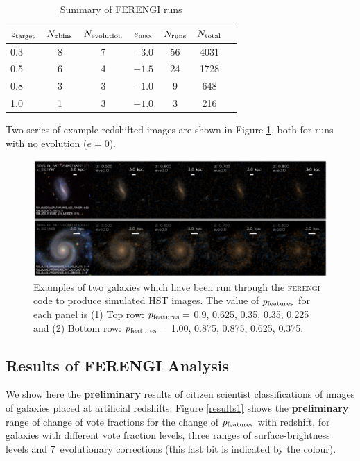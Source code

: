 \documentclass[usenatbib]{mn2e}
\newcommand{\ferengi}{\textsc{ferengi}}
\begin{document}
\begin{table}
\caption{Summary of FERENGI runs \label{ferengivalues}}
\begin{tabular}{lcccccc}
\hline\hline
$z_{\rm target}$ & $N_{z {\rm bins}}$ & $N_{\rm evolution}$ & $e_{\rm max}$ & $N_{\rm runs}$ & $N_{\rm total}$\\
\hline
0.3              & 8                  & 7                   & $-3.0$        & 56             & 4031 \\
0.5              & 6                  & 4                   & $-1.5$        & 24             & 1728 \\
0.8              & 3                  & 3                   & $-1.0$        &  9             &  648 \\
1.0              & 1                  & 3                   & $-1.0$        &  3             &  216 \\
\hline\hline
\end{tabular}
\end{table}

Two series of example redshifted images are shown in Figure \ref{exampleFERENGI}, both for runs with no evolution ($e=0$). 

\begin{figure}
\includegraphics[width=160mm]{example_ferengi.ps}
\caption{Examples of two galaxies which have been run through the \ferengi{} code to produce simulated HST images. The value of $p_{\rm features}$ for each panel is (1) Top row: $p_{\rm features}=$ 0.9, 0.625, 0.35, 0.35, 0.225 and (2) Bottom row: $p_{\rm features}=$ 1.00, 0.875, 0.875, 0.625, 0.375. \label{exampleFERENGI}}
\end{figure}

\subsection{Results of FERENGI Analysis}

We show here the {\bf preliminary} results of citizen scientist classifications of images of galaxies placed at artificial redshifts. Figure \ref{results1} shows the {\bf preliminary} range of change of vote fractions for the change of $p_{\rm features}$ with redshift, for galaxies with different vote fraction levels, three ranges of surface-brightness levels and 7~evolutionary corrections (this last bit is indicated by the colour). 
\end{document}
